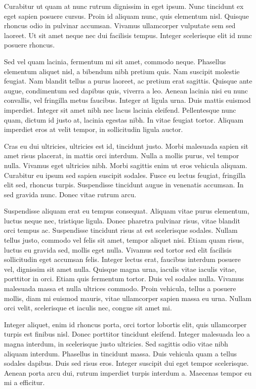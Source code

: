 Curabitur ut quam at nunc rutrum dignissim in eget ipsum. Nunc tincidunt ex eget sapien posuere cursus. Proin id aliquam nunc, quis elementum nisl. Quisque rhoncus odio in pulvinar accumsan. Vivamus ullamcorper vulputate sem sed laoreet. Ut sit amet neque nec dui facilisis tempus. Integer scelerisque elit id nunc posuere rhoncus.

Sed vel quam lacinia, fermentum mi sit amet, commodo neque. Phasellus elementum aliquet nisl, a bibendum nibh pretium quis. Nam suscipit molestie feugiat. Nam blandit tellus a purus laoreet, ac pretium erat sagittis. Quisque ante augue, condimentum sed dapibus quis, viverra a leo. Aenean lacinia nisi eu nunc convallis, vel fringilla metus faucibus. Integer at ligula urna. Duis mattis euismod imperdiet. Integer sit amet nibh nec lacus lacinia eleifend. Pellentesque nunc quam, dictum id justo at, lacinia egestas nibh. In vitae feugiat tortor. Aliquam imperdiet eros at velit tempor, in sollicitudin ligula auctor.

Cras eu dui ultricies, ultricies est id, tincidunt justo. Morbi malesuada sapien sit amet risus placerat, in mattis orci interdum. Nulla a mollis purus, vel tempor nulla. Vivamus eget ultricies nibh. Morbi sagittis enim ut eros vehicula aliquam. Curabitur eu ipsum sed sapien suscipit sodales. Fusce eu lectus feugiat, fringilla elit sed, rhoncus turpis. Suspendisse tincidunt augue in venenatis accumsan. In sed gravida nunc. Donec vitae rutrum arcu.

Suspendisse aliquam erat eu tempus consequat. Aliquam vitae purus elementum, luctus neque nec, tristique ligula. Donec pharetra pulvinar risus, vitae blandit orci tempus ac. Suspendisse tincidunt risus at est scelerisque sodales. Nullam tellus justo, commodo vel felis sit amet, tempor aliquet nisi. Etiam quam risus, luctus eu gravida sed, mollis eget nulla. Vivamus sed tortor sed elit facilisis sollicitudin eget accumsan felis. Integer lectus erat, faucibus interdum posuere vel, dignissim sit amet nulla. Quisque magna urna, iaculis vitae iaculis vitae, porttitor in orci. Etiam quis fermentum tortor. Duis vel sodales nulla. Vivamus malesuada massa et nulla ultrices commodo. Proin vehicula, tellus a posuere mollis, diam mi euismod mauris, vitae ullamcorper sapien massa eu urna. Nullam orci velit, scelerisque et iaculis nec, congue sit amet mi.

Integer aliquet, enim id rhoncus porta, orci tortor lobortis elit, quis ullamcorper turpis est finibus nisl. Donec porttitor tincidunt eleifend. Integer malesuada leo a magna interdum, in scelerisque justo ultricies. Sed sagittis odio vitae nibh aliquam interdum. Phasellus in tincidunt massa. Duis vehicula quam a tellus sodales dapibus. Duis sed risus eros. Integer suscipit dui eget tempor scelerisque. Aenean porta arcu dui, rutrum imperdiet turpis interdum a. Maecenas tempor eu mi a efficitur.


